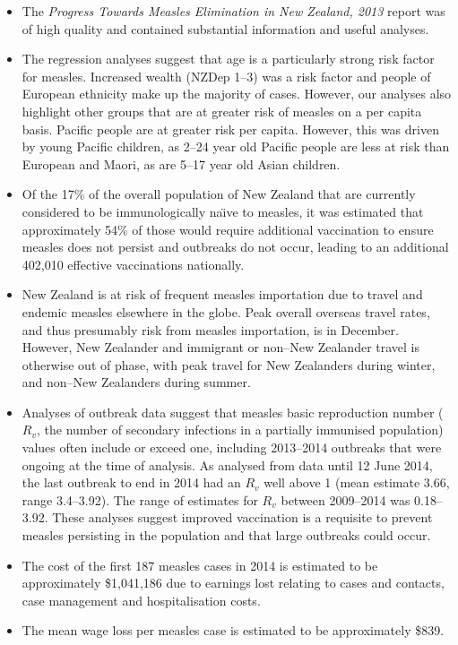 \documentclass{article}
\begin{document}
\begin{itemize}
\item The \emph {Progress Towards Measles Elimination in New Zealand, 2013} report was of high quality and contained substantial information and useful analyses.
\item The regression analyses suggest that age is a particularly strong risk factor for measles.  Increased wealth (NZDep 1--3) was a risk factor and people of European ethnicity make up the majority of cases. However, our analyses also highlight other groups that are at greater risk of measles on a per capita basis. Pacific people are at greater risk per capita. However, this was driven by young Pacific children, as 2--24 year old Pacific people are less at risk than European and Maori, as are 5--17 year old Asian children.
\item Of the 17\% of the overall population of New Zealand that are currently considered to be immunologically na\"{\i}ve to measles, it was estimated that approximately 54\% of those would require additional vaccination to ensure measles does not persist and outbreaks do not occur, leading to an additional 402,010 effective vaccinations nationally.
\item New Zealand is at risk of frequent measles importation due to travel and endemic measles elsewhere in the globe. Peak overall overseas travel rates, and thus presumably risk from measles importation, is in December. However, New Zealander and immigrant or non--New Zealander travel is otherwise out of phase, with peak travel for New Zealanders during winter, and non--New Zealanders during summer.
\item Analyses of outbreak data suggest that measles basic reproduction number ($R_v$, the number of secondary infections in a partially immunised population) values often include or exceed one, including 2013--2014 outbreaks that were ongoing at the time of analysis. As analysed from data until 12 June 2014, the last outbreak to end in 2014 had an $R_v$ well above 1 (mean estimate 3.66, range 3.4--3.92). The range of estimates for $R_v$ between 2009--2014 was 0.18--3.92. These analyses suggest improved vaccination is a requisite to prevent measles persisting in the population and that large outbreaks could occur.
\item The cost of the first 187 measles cases in 2014 is estimated to be approximately \$1,041,186 due to earnings lost relating to cases and contacts, case management and hospitalisation costs.
\item The mean wage loss per measles case is estimated to be approximately \$839.

\end{itemize}
\end{document}
